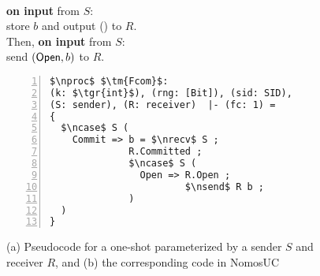 \begin{figure}
\centering
\begin{minipage}{0.38\textwidth}
\begin{bbox}[title={Functionality $\F_{\m{com}}(S, R)$}]\\
\textbf{on input}  from $S$:\\
\hspace*{1em} store $b$ and output () to $R$.\\
 Then, \textbf{on input}  from $S$:\\
 \hspace*{1em} send $(\mathsf{Open}, b)$ to $R$.
\end{bbox}
\end{minipage}
\hspace{3em}
\begin{minipage}{0.5\textwidth}
\begin{lstlisting}[basicstyle=\scriptsize\BeraMonottFamily, frame=single, mathescape, numbers=left, xleftmargin=2em, xrightmargin=2em]
$\nproc$ $\tm{Fcom}$: 
(k: $\tgr{int}$), (rng: [Bit]), (sid: SID),
(S: sender), (R: receiver)  |- (fc: 1) =
{
  $\ncase$ S (
    Commit => b = $\nrecv$ S ;
              R.Committed ;
              $\ncase$ S (
                Open => R.Open ;
                        $\nsend$ R b ;
              )
  )
}
\end{lstlisting}
\end{minipage}
\caption{(a) Pseudocode for a one-shot \Fcom parameterized by a sender $S$ and receiver $R$,
and (b) the corresponding code in NomosUC}
\label{fig:fcomideal}
\vspace{-4mm}
\end{figure}
